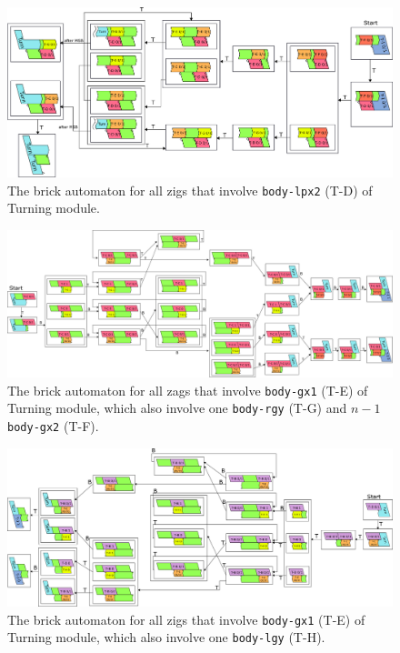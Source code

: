 \documentclass[runningheads]{llncs}
\begin{document}
\begin{figure}[ht]
\centering
\includegraphics[width=\linewidth]{Figs/Turner_BA/T-D_ver2.png}
\caption{The brick automaton for all zigs that involve \texttt{body-lpx2} (T-D) of Turning module.}
\label{fig:BA_T-D}
\end{figure}

\begin{figure}[ht]
\centering
\includegraphics[width=\linewidth]{Figs/Turner_BA/gx_right_ver3.png}
\caption{The brick automaton for all zags that involve \texttt{body-gx1} (T-E) of Turning module, which also involve one \texttt{body-rgy} (T-G) and $n-1$ \texttt{body-gx2} (T-F).}
\label{fig:BA_gx_right}
\end{figure}

\begin{figure}[ht]
\centering
\includegraphics[width=\linewidth]{Figs/Turner_BA/gx_left.png}
\caption{The brick automaton for all zigs that involve \texttt{body-gx1} (T-E) of Turning module, which also involve one \texttt{body-lgy} (T-H).}
\label{fig:BA_gx_left}
\end{figure}
\end{document}
